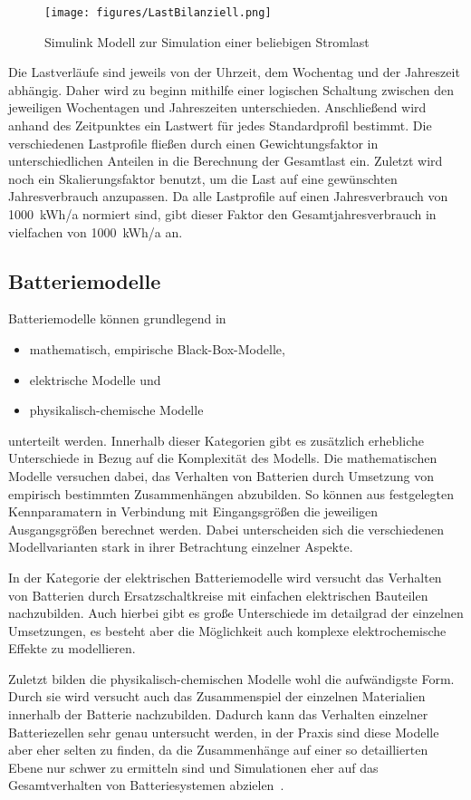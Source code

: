 \begin{figure}[H]
	\centering
	\texttt{[image: figures/LastBilanziell.png]}
	\caption{Simulink Modell zur Simulation einer beliebigen Stromlast}
	\label{fig:Last}
\end{figure}

Die Lastverläufe sind jeweils von der Uhrzeit, dem Wochentag und der Jahreszeit abhängig. Daher wird zu beginn mithilfe einer logischen Schaltung zwischen den jeweiligen Wochentagen und Jahreszeiten unterschieden. Anschließend wird anhand des Zeitpunktes ein Lastwert für jedes Standardprofil bestimmt. Die verschiedenen Lastprofile fließen durch einen Gewichtungsfaktor in unterschiedlichen Anteilen in die Berechnung der Gesamtlast ein. Zuletzt wird noch ein Skalierungsfaktor benutzt, um die Last auf eine gewünschten Jahresverbrauch anzupassen. Da alle Lastprofile auf einen Jahresverbrauch von 1000~kWh/a normiert sind, gibt dieser Faktor den Gesamtjahresverbrauch in vielfachen von 1000~kWh/a an.
\subsection{Batteriemodelle}\label{Batteriemodelle}
Batteriemodelle können grundlegend in 
\begin{itemize}
    \item mathematisch, empirische Black-Box-Modelle,
    \item elektrische Modelle und
   \item physikalisch-chemische Modelle
\end{itemize}
unterteilt werden. 
Innerhalb dieser Kategorien gibt es zusätzlich erhebliche Unterschiede in Bezug auf die Komplexität des Modells.
Die mathematischen Modelle versuchen dabei, das Verhalten von Batterien durch Umsetzung von empirisch bestimmten
Zusammenhängen abzubilden.
So können aus festgelegten Kennparamatern in Verbindung mit Eingangsgrößen die jeweiligen Ausgangsgrößen berechnet werden.
Dabei unterscheiden sich die verschiedenen Modellvarianten stark in ihrer Betrachtung einzelner Aspekte.

In der Kategorie der elektrischen Batteriemodelle wird versucht das Verhalten von Batterien durch Ersatzschaltkreise
mit einfachen elektrischen Bauteilen nachzubilden.
Auch hierbei gibt es große Unterschiede im detailgrad der einzelnen Umsetzungen, es besteht aber die Möglichkeit
auch komplexe elektrochemische Effekte zu modellieren.

Zuletzt bilden die physikalisch-chemischen Modelle wohl die aufwändigste Form.
Durch sie wird versucht auch das Zusammenspiel der einzelnen Materialien innerhalb der Batterie nachzubilden.
Dadurch kann das Verhalten einzelner Batteriezellen sehr genau untersucht werden, in der Praxis sind diese
Modelle aber eher selten zu finden, da die Zusammenhänge auf einer so detaillierten Ebene nur schwer zu ermitteln sind
und Simulationen eher auf das Gesamtverhalten von Batteriesystemen abzielen~\parencite[]{keil2012aufbau}.

